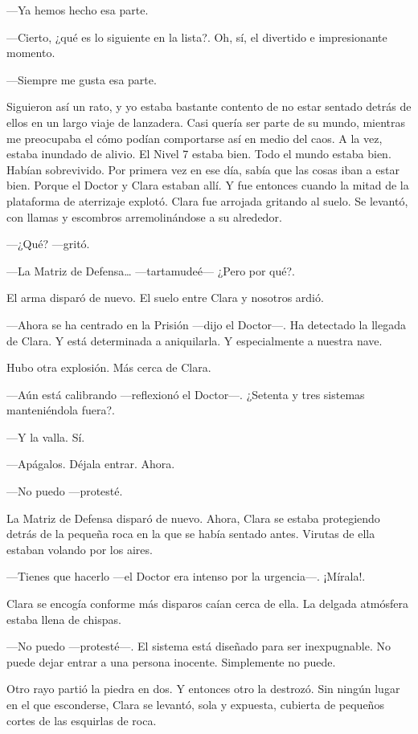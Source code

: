 ---Ya hemos hecho esa parte.

---Cierto, ¿qué es lo siguiente en la lista?. Oh, sí, el divertido e
impresionante momento.

---Siempre me gusta esa parte.

Siguieron así un rato, y yo estaba bastante contento de no estar sentado
detrás de ellos en un largo viaje de lanzadera. Casi quería ser parte de
su mundo, mientras me preocupaba el cómo podían comportarse así en medio
del caos. A la vez, estaba inundado de alivio. El Nivel 7 estaba bien.
Todo el mundo estaba bien. Habían sobrevivido. Por primera vez en ese
día, sabía que las cosas iban a estar bien. Porque el Doctor y Clara
estaban allí. Y fue entonces cuando la mitad de la plataforma de
aterrizaje explotó. Clara fue arrojada gritando al suelo. Se levantó,
con llamas y escombros arremolinándose a su alrededor.

---¿Qué? ---gritó.

---La Matriz de Defensa\ldots{} ---tartamudeé--- ¿Pero por qué?.

El arma disparó de nuevo. El suelo entre Clara y nosotros ardió.

---Ahora se ha centrado en la Prisión ---dijo el Doctor---. Ha detectado
la llegada de Clara. Y está determinada a aniquilarla. Y especialmente a
nuestra nave.

Hubo otra explosión. Más cerca de Clara.

---Aún está calibrando ---reflexionó el Doctor---. ¿Setenta y tres
sistemas manteniéndola fuera?.

---Y la valla. Sí.

---Apágalos. Déjala entrar. Ahora.

---No puedo ---protesté.

La Matriz de Defensa disparó de nuevo. Ahora, Clara se estaba
protegiendo detrás de la pequeña roca en la que se había sentado antes.
Virutas de ella estaban volando por los aires.

---Tienes que hacerlo ---el Doctor era intenso por la urgencia---.
¡Mírala!.

Clara se encogía conforme más disparos caían cerca de ella. La delgada
atmósfera estaba llena de chispas.

---No puedo ---protesté---. El sistema está diseñado para ser
inexpugnable. No puede dejar entrar a una persona inocente. Simplemente
no puede.

Otro rayo partió la piedra en dos. Y entonces otro la destrozó. Sin
ningún lugar en el que esconderse, Clara se levantó, sola y expuesta,
cubierta de pequeños cortes de las esquirlas de roca.

